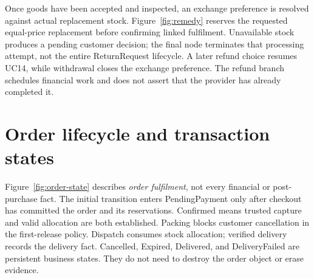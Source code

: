 Once goods have been accepted and inspected, an exchange preference is resolved against actual replacement stock. Figure~\ref{fig:remedy} reserves the requested equal-price replacement before confirming linked fulfilment. Unavailable stock produces a pending customer decision; the final node terminates that processing attempt, not the entire ReturnRequest lifecycle. A later refund choice resumes UC14, while withdrawal closes the exchange preference. The refund branch schedules financial work and does not assert that the provider has already completed it.

\section{Order lifecycle and transaction states}
Figure~\ref{fig:order-state} describes \emph{order fulfilment}, not every financial or post-purchase fact. The initial transition enters PendingPayment only after checkout has committed the order and its reservations. Confirmed means trusted capture and valid allocation are both established. Packing blocks customer cancellation in the first-release policy. Dispatch consumes stock allocation; verified delivery records the delivery fact. Cancelled, Expired, Delivered, and DeliveryFailed are persistent business states. They do not need to destroy the order object or erase evidence.
